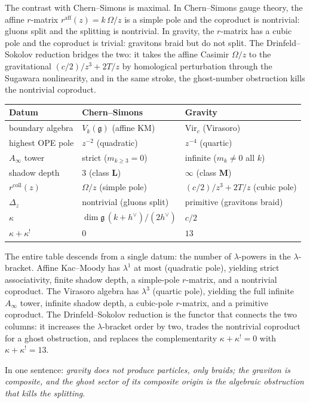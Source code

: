 The contrast with Chern--Simons is maximal. In Chern--Simons
gauge theory, the affine $r$-matrix $r^{\mathrm{aff}}(z) = k\,\Omega/z$
is a simple pole and the coproduct is nontrivial: gluons split
and the splitting is nontrivial. In gravity, the $r$-matrix has
a cubic pole and the coproduct is trivial: gravitons braid but
do not split. The Drinfeld--Sokolov reduction bridges the two:
it takes the affine Casimir $\Omega/z$ to the gravitational
$(c/2)/z^3 + 2T/z$ by homological perturbation through the
Sugawara nonlinearity, and in the same stroke, the ghost-number
obstruction kills the nontrivial coproduct.

\begin{center}
\small
\renewcommand{\arraystretch}{1.15}
\begin{tabular}{lll}
\textbf{Datum} & \textbf{Chern--Simons} & \textbf{Gravity} \\
\hline
boundary algebra
 & $V_k(\mathfrak{g})$ (affine KM)
 & $\mathrm{Vir}_c$ (Virasoro) \\[2pt]
highest OPE pole
 & $z^{-2}$ (quadratic)
 & $z^{-4}$ (quartic) \\[2pt]
$A_\infty$ tower
 & strict ($m_{k \geq 3} = 0$)
 & infinite ($m_k \neq 0$ all $k$) \\[2pt]
shadow depth
 & $3$ (class $\mathbf{L}$)
 & $\infty$ (class $\mathbf{M}$) \\[2pt]
$r^{\mathrm{coll}}(z)$
 & $\Omega/z$ (simple pole)
 & $(c/2)/z^3 + 2T/z$ (cubic pole) \\[2pt]
$\Delta_z$
 & nontrivial (gluons split)
 & primitive (gravitons braid) \\[2pt]
$\kappa$
 & $\dim\mathfrak{g}\,(k+h^\vee)/(2h^\vee)$
 & $c/2$ \\[2pt]
$\kappa + \kappa^!$
 & $0$
 & $13$
\end{tabular}
\end{center}

The entire table descends from a single datum: the number of
$\lambda$-powers in the $\lambda$-bracket. Affine Kac--Moody has
$\lambda^1$ at most (quadratic pole), yielding strict associativity,
finite shadow depth, a simple-pole $r$-matrix, and a nontrivial
coproduct. The Virasoro algebra has $\lambda^3$ (quartic pole),
yielding the full infinite $A_\infty$ tower, infinite shadow depth,
a cubic-pole $r$-matrix, and a primitive coproduct. The
Drinfeld--Sokolov reduction is the functor that connects the two
columns: it increases the $\lambda$-bracket order by two, trades
the nontrivial coproduct for a ghost obstruction, and replaces the
complementarity $\kappa + \kappa^! = 0$ with $\kappa + \kappa^! = 13$.

\smallskip

In one sentence:
\emph{gravity does not produce particles, only braids; the graviton
is composite, and the ghost sector of its composite origin is the
algebraic obstruction that kills the splitting}.
